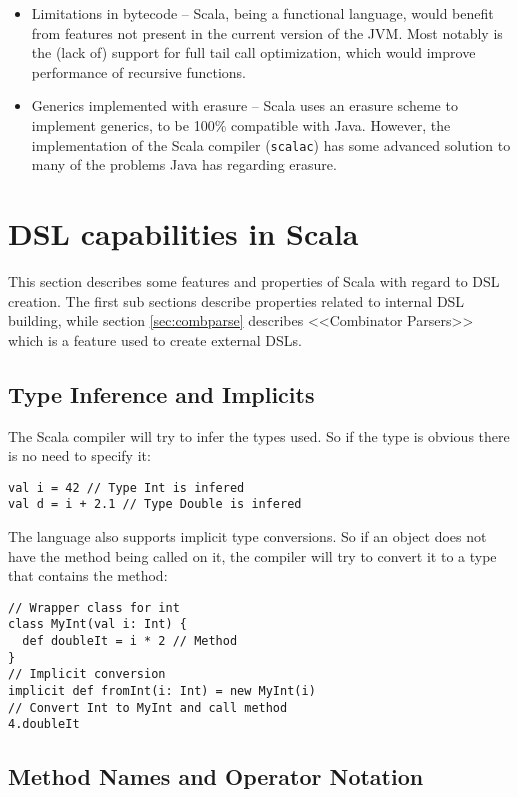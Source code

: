 \documentclass[a4paper,english]{report}
\begin{document}
\begin{itemize}
\item Limitations in bytecode -- Scala, being a functional language,
  would benefit from features not present in the current version of
  the JVM. Most notably is the (lack of) support for full tail call
  optimization, which would improve performance of recursive
  functions.
\item Generics implemented with erasure -- Scala uses an erasure
  scheme to implement generics, to be 100\% compatible with
  Java. However, the implementation of the Scala compiler
  (\texttt{scalac}) has some advanced solution to many of the problems
  Java has regarding erasure\cite{emi06}.
\end{itemize}

\section{DSL capabilities in Scala}

This section describes some features and properties of Scala with
regard to DSL creation. The first sub sections describe properties
related to internal DSL building, while section \vref{sec:combparse}
describes <<Combinator Parsers>> which is a feature used to create
external DSLs.

\subsection{Type Inference and Implicits}

The Scala compiler will try to infer the types used. So if the type is
obvious there is no need to specify it:

\begin{lstlisting}
val i = 42 // Type Int is infered
val d = i + 2.1 // Type Double is infered
\end{lstlisting}

The language also supports implicit type conversions. So if an object
does not have the method being called on it, the compiler will try to
convert it to a type that contains the method:

\begin{lstlisting}
// Wrapper class for int
class MyInt(val i: Int) {
  def doubleIt = i * 2 // Method
}
// Implicit conversion
implicit def fromInt(i: Int) = new MyInt(i)
// Convert Int to MyInt and call method
4.doubleIt
\end{lstlisting}

\subsection{Method Names and Operator Notation}
\end{document}
